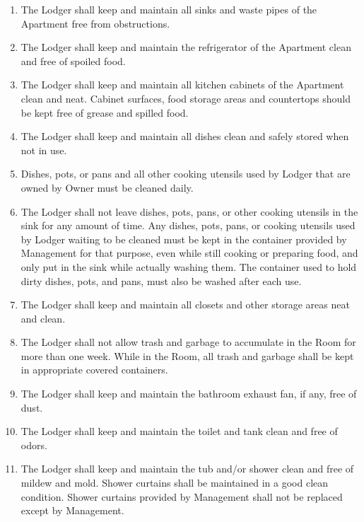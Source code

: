 \documentclass[12pt,letterpaper]{article}
\newcommand{\lodger}{Lodger}
\newcommand{\management}{Management}
\newcommand{\apt}{Apartment}
\newcommand{\room}{Room}
\begin{document}
\begin{enumerate}
		\item The \lodger{} shall keep and maintain all sinks and waste pipes of the \apt{} free from obstructions. 
		\item The \lodger{} shall keep and maintain the refrigerator of the \apt{} clean and free of spoiled food.
		\item The \lodger{} shall keep and maintain all kitchen cabinets of the \apt{} clean and neat. Cabinet surfaces, food storage areas and countertops should be kept free of grease and spilled food. 
		\item The \lodger{} shall keep and maintain all dishes clean and safely stored when not in use. 
		\item Dishes, pots, or pans and all other cooking utensils used by \lodger{} that are owned by Owner must be cleaned daily.
		\item The \lodger{} shall not leave dishes, pots, pans, or other cooking utensils in the sink for any amount of time. Any dishes, pots, pans, or cooking utensils used by \lodger{} waiting to be cleaned must be kept in the container provided by \management{} for that purpose, even while still cooking or preparing food, and only put in the sink while actually washing them. The container used to hold dirty dishes, pots, and pans, must also be washed after each use.
		\item The \lodger{} shall keep and maintain all closets and other storage areas neat and clean. 
		\item The \lodger{} shall not allow trash and garbage to accumulate in the \room{} for more than one week. While in the \room{}, all trash and garbage shall be kept in appropriate covered containers. 
		\item The \lodger{} shall keep and maintain the bathroom exhaust fan, if any, free of dust. 
		\item The \lodger{} shall keep and maintain the toilet and tank clean and free of odors. 
		\item The \lodger{} shall keep and maintain the tub and/or shower clean and free of mildew and mold. Shower curtains shall be maintained in a good clean condition. Shower curtains provided by \management{} shall not be replaced except by \management{}.
	\end{enumerate}
\end{document}
